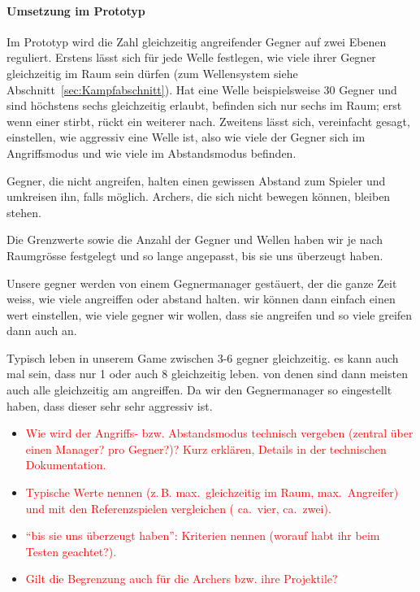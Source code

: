 \documentclass[../Main.tex]{subfiles}
\begin{document}
\paragraph{Umsetzung im Prototyp}
Im Prototyp wird die Zahl gleichzeitig angreifender Gegner auf zwei Ebenen reguliert. Erstens lässt sich für jede Welle festlegen, wie viele ihrer Gegner gleichzeitig im Raum sein dürfen (zum Wellensystem siehe Abschnitt~\ref{sec:Kampfabschnitt}). Hat eine Welle beispielsweise 30 Gegner und sind höchstens sechs gleichzeitig erlaubt, befinden sich nur sechs im Raum; erst wenn einer stirbt, rückt ein weiterer nach. Zweitens lässt sich, vereinfacht gesagt, einstellen, wie aggressiv eine Welle ist, also wie viele der Gegner sich im Angriffsmodus und wie viele im Abstandsmodus befinden.

Gegner, die nicht angreifen, halten einen gewissen Abstand zum Spieler und umkreisen ihn, falls möglich. Archers, die sich nicht bewegen können, bleiben stehen.

Die Grenzwerte sowie die Anzahl der Gegner und Wellen haben wir je nach Raumgrösse festgelegt und so lange angepasst, bis sie uns überzeugt haben.

Unsere gegner werden von einem Gegnermanager gestäuert, der die ganze Zeit weiss, wie viele angreiffen oder abstand halten. wir können dann einfach einen wert einstellen, wie viele gegner wir wollen, dass sie angreifen und so viele greifen dann auch an.

Typisch leben in unserem Game zwischen 3-6 gegner gleichzeitig. es kann auch mal sein, dass nur 1 oder auch 8 gleichzeitig leben. von denen sind dann meisten auch alle gleichzeitig am angreiffen. Da wir den Gegnermanager so eingestellt haben, dass dieser sehr sehr aggressiv ist.

\begin{itemize}[leftmargin=1.5cm]
    \item \textcolor{red}{Wie wird der Angriffs- bzw. Abstandsmodus technisch vergeben (zentral über einen Manager? pro Gegner?)? Kurz erklären, Details in der technischen Dokumentation.}
    \item \textcolor{red}{Typische Werte nennen (z.\,B. max.\ gleichzeitig im Raum, max.\ Angreifer) und mit den Referenzspielen vergleichen ( ca.\ vier,  ca.\ zwei).}
    \item \textcolor{red}{\enquote{bis sie uns überzeugt haben}: Kriterien nennen (worauf habt ihr beim Testen geachtet?).}
    \item \textcolor{red}{Gilt die Begrenzung auch für die Archers bzw. ihre Projektile?}
\end{itemize}
\end{document}
